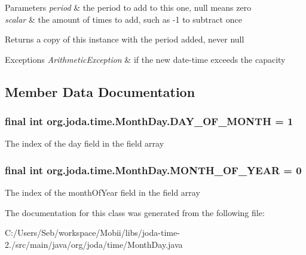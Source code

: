 \begin{DoxyParams}{Parameters}
{\em period} & the period to add to this one, null means zero \\
\hline
{\em scalar} & the amount of times to add, such as -\/1 to subtract once \\
\hline
\end{DoxyParams}
\begin{DoxyReturn}{Returns}
a copy of this instance with the period added, never null 
\end{DoxyReturn}

\begin{DoxyExceptions}{Exceptions}
{\em Arithmetic\-Exception} & if the new date-\/time exceeds the capacity \\
\hline
\end{DoxyExceptions}


\subsection{Member Data Documentation}
\hypertarget{classorg_1_1joda_1_1time_1_1_month_day_a2cd2f4484b1f079a20f292a60b3233d1}{
\subsubsection[{D\-A\-Y\-\_\-\-O\-F\-\_\-\-M\-O\-N\-T\-H}]{\setlength{\rightskip}{0pt plus 5cm}final int org.\-joda.\-time.\-Month\-Day.\-D\-A\-Y\-\_\-\-O\-F\-\_\-\-M\-O\-N\-T\-H = 1\hspace{0.3cm}{\ttfamily [static]}}}\label{classorg_1_1joda_1_1time_1_1_month_day_a2cd2f4484b1f079a20f292a60b3233d1}
The index of the day field in the field array \hypertarget{classorg_1_1joda_1_1time_1_1_month_day_aae75da69871f881b0be9da952cf51b5a}{
\subsubsection[{M\-O\-N\-T\-H\-\_\-\-O\-F\-\_\-\-Y\-E\-A\-R}]{\setlength{\rightskip}{0pt plus 5cm}final int org.\-joda.\-time.\-Month\-Day.\-M\-O\-N\-T\-H\-\_\-\-O\-F\-\_\-\-Y\-E\-A\-R = 0\hspace{0.3cm}{\ttfamily [static]}}}\label{classorg_1_1joda_1_1time_1_1_month_day_aae75da69871f881b0be9da952cf51b5a}
The index of the month\-Of\-Year field in the field array 

The documentation for this class was generated from the following file\-:\begin{DoxyCompactItemize}
\item 
C\-:/\-Users/\-Seb/workspace/\-Mobii/libs/joda-\/time-\/2./src/main/java/org/joda/time/Month\-Day.\-java\end{DoxyCompactItemize}
